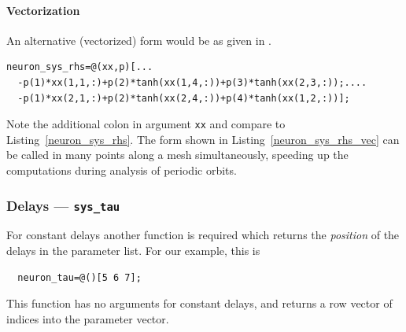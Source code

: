 \documentclass[10pt]{scrartcl}
\newcommand{\blist}[1]{\mbox{\lstinline!#1!}}
\begin{document}
\paragraph{Vectorization}
An alternative (vectorized) form would be as given in
.
\begin{lstlisting}[float,frame=lines,label=neuron_sys_rhs_vec,caption={Alternative definition of the right-hand side of \eqref{example_sys}, vectorized for speed-up of periodic orbit computations.}]
  neuron_sys_rhs=@(xx,p)[...
  -p(1)*xx(1,1,:)+p(2)*tanh(xx(1,4,:))+p(3)*tanh(xx(2,3,:));....
  -p(1)*xx(2,1,:)+p(2)*tanh(xx(2,4,:))+p(4)*tanh(xx(1,2,:))];
\end{lstlisting}
Note the additional colon in argument \blist{xx} and compare to
Listing~\ref{neuron_sys_rhs}. The form shown in
Listing~\ref{neuron_sys_rhs_vec} can be called in many points along a
mesh simultaneously, speeding up the computations during analysis of
periodic orbits.

\subsubsection{Delays --- \texorpdfstring{\blist{sys_tau}}{sys\_tau}} \label{sec:consttau}
For constant delays another function is required which returns the
\emph{position} of the delays in the parameter list. For our example,
this is
\begin{lstlisting}
  neuron_tau=@()[5 6 7];
\end{lstlisting}
This function has no arguments for constant delays, and returns a row
vector of indices into the parameter vector.
\end{document}
